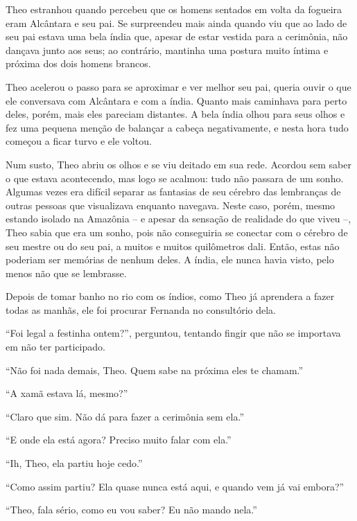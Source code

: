 Theo estranhou quando percebeu que os homens sentados em volta da
fogueira eram Alcântara e seu pai. Se surpreendeu mais ainda
quando viu que ao lado de seu pai estava uma bela índia que, apesar
de estar vestida para a cerimônia, não dançava junto aos seus; ao
contrário, mantinha uma postura muito íntima e próxima dos dois homens
brancos.

Theo acelerou o passo para se aproximar e ver melhor seu pai, queria
ouvir o que ele conversava com Alcântara e com a índia. Quanto mais
caminhava para perto deles, porém, mais eles pareciam distantes. A bela
índia olhou para seus olhos e fez uma pequena menção de balançar a cabeça
negativamente, e nesta hora tudo começou a ficar turvo e ele voltou.

Num susto, Theo abriu os olhos e se viu
deitado em sua rede. Acordou sem saber o que estava acontecendo, mas
logo se acalmou: tudo não passara de um sonho.
Algumas vezes era difícil separar as fantasias de seu cérebro das
lembranças de outras pessoas que visualizava enquanto navegava. Neste
caso, porém, mesmo estando isolado na Amazônia -- e apesar da sensação
de realidade do que viveu --, Theo sabia que era um sonho, pois não
conseguiria se conectar com
o cérebro de seu mestre ou do seu pai, a muitos e muitos quilômetros
dali. Então, estas não poderiam ser memórias de nenhum deles. A
índia, ele nunca havia visto, pelo menos não que se lembrasse.

\asterisc


Depois de tomar banho no rio com os índios, como Theo já aprendera a
fazer todas as manhãs, ele foi procurar Fernanda no consultório dela.

``Foi legal a festinha ontem?'', perguntou, tentando fingir que não se
importava em não ter participado.

``Não foi nada demais, Theo. Quem sabe na próxima eles te chamam.''

``A xamã estava lá, mesmo?''

``Claro que sim. Não dá para fazer a cerimônia sem ela.''

``E onde ela está agora? Preciso muito falar com ela.''

``Ih, Theo, ela partiu hoje cedo.''

``Como assim partiu? Ela quase nunca está aqui, e quando vem já vai
embora?''

``Theo, fala sério, como eu vou saber? Eu não mando nela.''

